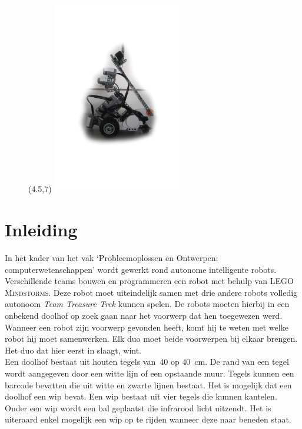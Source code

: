 \documentclass[eind]{penoverslag}
\begin{document}
\begin{figure}[!hb]
\begin{textblock}{38}(4.5,7)
    \includegraphics[width=0.50\textwidth]{robotFP}
    \label{fig:robotFP}
\end{textblock}
\end{figure}

\newpage
\setcounter{tocdepth}{3}
\tableofcontents
\newpage

\section{Inleiding} %
\label{ssec:Inl}
In het kader van het vak `Probleemoplossen en Ontwerpen: computerwetenschappen' wordt gewerkt rond autonome intelligente robots. Verschillende teams bouwen en programmeren een robot met behulp van \textsc{LEGO Mindstorms}. Deze robot moet uiteindelijk samen met drie andere robots volledig autonoom \textit{Team Treasure Trek} kunnen spelen.
De robots moeten hierbij in een onbekend doolhof op zoek gaan naar het voorwerp dat hen toegewezen werd. Wanneer een robot zijn voorwerp gevonden heeft, komt hij te weten met welke robot hij moet samenwerken. Elk duo moet beide voorwerpen bij elkaar brengen. Het duo dat hier eerst in slaagt, wint.\\

Een doolhof bestaat uit houten tegels van~$40$ op $40$~cm. De rand van een tegel wordt aangegeven door een witte lijn of een opstaande muur. Tegels kunnen een barcode bevatten die uit witte en zwarte lijnen bestaat. Het is mogelijk dat een doolhof een wip bevat. Een wip bestaat uit vier tegels die kunnen kantelen. Onder een wip wordt een bal geplaatst die infrarood licht uitzendt. Het is uiteraard enkel mogelijk een wip op te rijden wanneer deze naar beneden staat.
\end{document}
